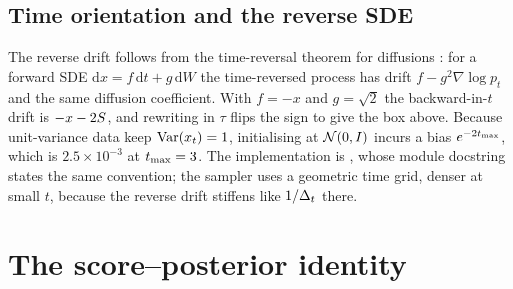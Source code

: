 \subsection{Time orientation and the reverse SDE}

\begin{center}
\end{center}

The reverse drift follows from the time-reversal theorem for diffusions
\citep{anderson1982,haussmann1986}: for a forward SDE $\mathrm{d}x = f\,\mathrm{d}t +
g\,\mathrm{d}W$ the time-reversed process has drift $f - g^2\nabla\log p_t$ and the same
diffusion coefficient. With $f=-x$ and $g=\sqrt{2}$ the backward-in-$t$ drift is
$-x - 2S$, and rewriting in $\tau$ flips the sign to give the box above. Because unit-variance
data keep $\operatorname{Var}(x_t)=1$, initialising at $\mathcal{N}\!\left(0,I\right)$ incurs a bias $e^{-2t_{\max}}$, which is
$2.5\times10^{-3}$ at $t_{\max}=3$. The implementation is
, whose module docstring states the same convention; the sampler uses a
geometric time grid, denser at small $t$, because the reverse drift stiffens like
$1/\Delta_t$ there.

\section{The score--posterior identity}
\label{app:identity}

